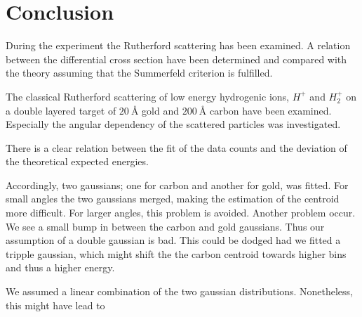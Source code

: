\section{Conclusion}
During the experiment the Rutherford scattering has been examined. A relation between the differential cross section have been determined and compared with the theory assuming that the Summerfeld criterion is fulfilled. 


The classical Rutherford scattering of low energy hydrogenic ions, $H^+$ and $H_2^+$ on a double layered target of $\SI{20}{\angstrom}$ gold and $\SI{200}{\angstrom}$ carbon have been examined. Especially the angular dependency of the scattered particles was investigated. 


There is a clear relation between the fit of the data counts and the deviation of the theoretical expected energies.  

Accordingly, two gaussians; one for carbon and another for gold, was fitted. For small angles the two gaussians merged, making the estimation of the centroid more difficult. For larger angles, this problem is avoided. Another problem occur. We see a small bump in between the carbon and gold gaussians. Thus our assumption of a double gaussian is bad. This could be dodged had we fitted a tripple gaussian, which might shift the the carbon centroid towards higher bins and thus a higher energy. 



We assumed a linear combination of the two gaussian distributions. Nonetheless, this might have lead to 

